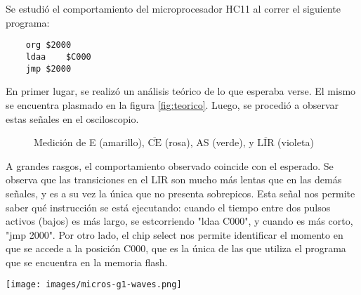 \documentclass[micros_g1_main.tex]{subfiles}
\begin{document}
\section{}

Se estudi\'o el comportamiento del microprocesador HC11 al correr el siguiente programa:

	\begin{lstlisting}
	org	$2000
	ldaa	$C000
	jmp	$2000
	\end{lstlisting}

En primer lugar, se realiz\'o un an\'alisis te\'orico de lo que esperaba verse. El mismo se encuentra plasmado en la figura \ref{fig:teorico}. Luego, se procedi\'o a observar estas se\~nales en el osciloscopio.

\begin{figure}[ht]
	\centering
	\caption{Medici\'on de E (amarillo), $\overline{\text{CE}}$ (rosa), AS (verde), y $\overline{\text{LIR}}$ (violeta)}
\end{figure}

A grandes rasgos, el comportamiento observado coincide con el esperado. Se observa que las transiciones en el LIR son mucho m\'as lentas que en las dem\'as se\~nales, y es a su vez la \'unica que no presenta sobrepicos. Esta se\~nal nos permite saber qu\'e instrucci\'on se est\'a ejecutando: cuando el tiempo entre dos pulsos activos (bajos) es m\'as largo, se est\a corriendo "ldaa C000", y cuando es m\'as corto, "jmp 2000". Por otro lado, el chip select nos permite identificar el momento en que se accede a la posici\'on C000, que es la \'unica de las que utiliza el programa que se encuentra en la memoria flash.


\begin{sidewaysfigure}[ht]
	\centering
	\texttt{[image: images/micros-g1-waves.png]}
	\caption{Diagrama de tiempos del programa analizado}
	\label{fig:teorico}
\end{sidewaysfigure}
\end{document}
